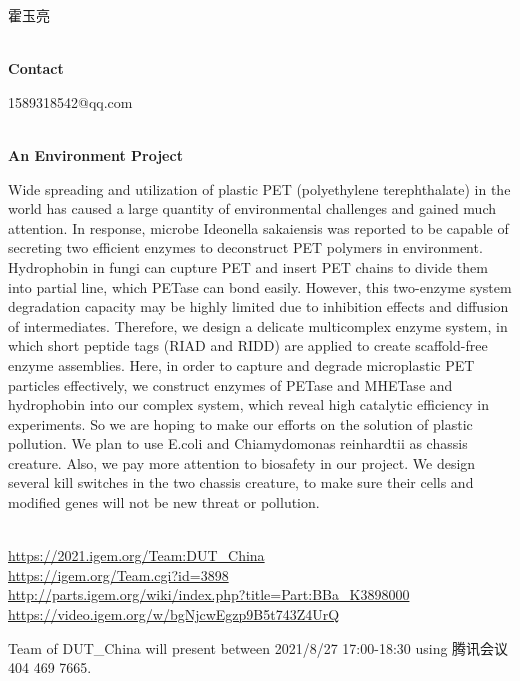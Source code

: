   霍玉亮


\textbf{\\Contact}

  1589318542@qq.com

\textbf{\\An Environment Project\\}\begin{spacing}{1.5}

Wide spreading and utilization of plastic PET (polyethylene terephthalate) in the world has caused a large quantity of environmental challenges and gained much attention. In response, microbe Ideonella sakaiensis was reported to be capable of secreting two efficient enzymes to deconstruct PET polymers in environment. Hydrophobin in fungi can cupture PET and insert PET chains to divide them into partial line, which PETase can bond easily. However, this two-enzyme system degradation capacity may be highly limited due to inhibition effects and diffusion of intermediates. Therefore, we design a delicate multicomplex enzyme system, in which short peptide tags (RIAD and RIDD) are applied to create scaffold-free enzyme assemblies. Here, in order to capture and degrade microplastic PET particles effectively, we construct enzymes of PETase and MHETase and hydrophobin into our complex system, which reveal high catalytic efficiency in experiments. So we are hoping to make our efforts on the solution of plastic pollution. We plan to use E.coli and Chiamydomonas reinhardtii as chassis creature. Also, we pay more attention to biosafety in our project. We design several kill switches in the two chassis creature, to make sure their cells and modified genes will not be new threat or pollution.\end{spacing}
\\

\url{https://2021.igem.org/Team:DUT\_China }\\
\url{https://igem.org/Team.cgi?id=3898 }\\
\url{http://parts.igem.org/wiki/index.php?title=Part:BBa_K3898000 }\\
\url{https://video.igem.org/w/bgNjcwEgzp9B5t743Z4UrQ }\\

\vfill{}









Team of DUT\_China will present between   2021/8/27 17:00-18:30      using 腾讯会议 404 469 7665.
\newpage


